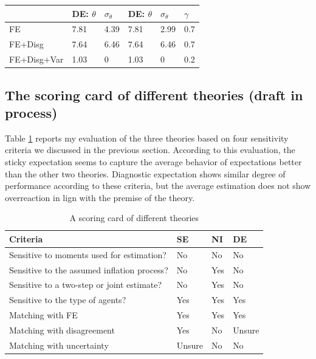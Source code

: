 \documentclass[12pt]{article}
\begin{document}
\begin{table}[p]
\begin{tabular}{llllll}
			\hline 
		& DE: $\theta$               & $\sigma_\theta$            & DE: $\theta$              & $\sigma_\theta$       & $\gamma$ \\
			\hline 
		FE           & 7.81                       & 4.39                       & 7.81                      & 2.99                  & 0.7      \\
		FE+Disg      & 7.64                       & 6.46                       & 7.64                      & 6.46                  & 0.7      \\
		FE+Disg+Var  & 1.03                       & 0                          & 1.03                      & 0                     & 0.2     \\
		\hline 
	\end{tabular}
\end{table}

\subsection{The scoring card of different theories (draft in process)}

Table \ref{scoringcard} reports my evaluation of the three theories based on four sensitivity criteria we discussed in the previous section. According to this evaluation, the sticky expectation seems to capture the average behavior of expectations better than the other two theories. Diagnostic expectation shows similar degree of performance according to these criteria, but the average estimation does not show overreaction in lign with the premise of the theory. 

	\begin{table}[p]
	\caption{A scoring card of different theories} 
	\label{scoringcard}
	\centering
	\begin{tabular}{llll}
		\hline 
		Criteria                                    & SE     & NI  & DE     \\
		\hline 
		Sensitive to moments used for estimation?   & No     & No  & No     \\
		Sensitive to the assumed inflation process? & No     & Yes & No     \\
		Sensitive to a two-step or joint estimate?  & No     & Yes & No     \\
		Sensitive to the type of agents?            & Yes    & Yes & Yes    \\
		Matching with FE                            & Yes    & Yes & Yes    \\
		Matching with disagreement                  & Yes    & No  & Unsure \\
		Matching with uncertainty                   & Unsure & No  & No    \\
		\hline 
	\end{tabular}
\end{table}
\end{document}
